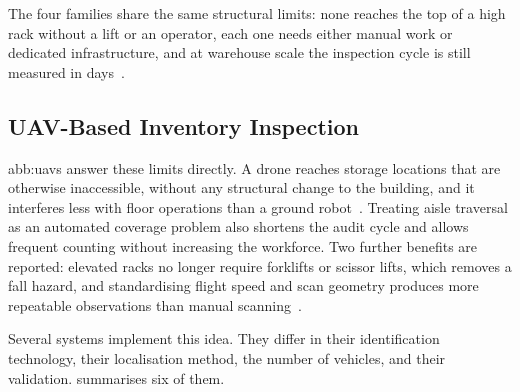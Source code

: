 The four families share the same structural limits: none reaches the top of a
high rack without a lift or an operator, each one needs either manual work or
dedicated infrastructure, and at warehouse scale the inspection cycle is still
measured in days~\cite{kalinov2020warevision, pore2026uavqr}.

\subsection{UAV-Based Inventory Inspection}%
\label{subsec:bg:inspection-uav}

\Glspl{abb:uav} answer these limits directly. A drone reaches storage locations
that are otherwise inaccessible, without any structural change to the building,
and it interferes less with floor operations than a ground
robot~\cite{pore2026uavqr}. Treating aisle traversal as an automated coverage
problem also shortens the audit cycle and allows frequent counting without
increasing the workforce. Two further benefits are reported: elevated racks no
longer require forklifts or scissor lifts, which removes a fall hazard, and
standardising flight speed and scan geometry produces more repeatable
observations than manual scanning~\cite{pore2026drone}.

Several systems implement this idea. They differ in their identification
technology, their localisation method, the number of vehicles, and their
validation.  summarises six of them.

